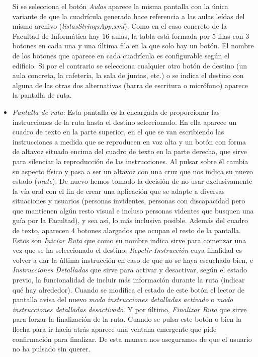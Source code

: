 \begin{itemize}
	Si se selecciona el botón \textit{Aulas} aparece la misma pantalla con la única variante de que la cuadrícula generada hace referencia a las aulas leídas del mismo archivo (\textit{listasStringsApp.xml}). Como en el caso concreto de la Facultad de Informática hay 16 aulas, la tabla está formada por 5 filas con 3 botones en cada una y una última fila en la que solo hay un botón. El nombre de los botones que aparece en cada cuadrícula es configurable según el edificio. Si por el contrario se selecciona cualquier otro botón de destino (un aula concreta, la cafetería, la sala de juntas, etc.) o se indica el destino con alguna de las otras dos alternativas (barra de escritura o micrófono) aparece la pantalla de ruta.
	
	\item \textit{Pantalla de ruta:} Esta pantalla es la encargada de proporcionar las instrucciones de la ruta hasta el destino seleccionado. En ella aparece un cuadro de texto en la parte superior, en el que se van escribiendo las instrucciones a medida que se reproducen en voz alta y un botón con forma de altavoz situado encima del cuadro de texto en la parte derecha, que sirve para silenciar la reproducción de las instrucciones. Al pulsar sobre él cambia su aspecto físico y pasa a ser un altavoz con una cruz que nos indica su nuevo estado (\textit{mute}). De nuevo hemos tomado la decisión de no usar exclusivamente la vía oral con el fin de crear una aplicación que se adapte a diversas situaciones y usuarios (personas invidentes, personas con discapacidad pero que mantienen algún resto visual e incluso personas videntes que busquen una guía por la Facultad), y sea así, lo más inclusiva posible. Además del cuadro de texto, aparecen 4 botones alargados que ocupan el resto de la pantalla. Estos son \textit{Iniciar Ruta} que como su nombre indica sirve para comenzar una vez que se ha seleccionado el destino, \textit{Repetir Instrucción} cuya finalidad es volver a dar la última instrucción en caso de que no se haya escuchado bien, e \textit{Instrucciones Detalladas} que sirve para activar y desactivar, según el estado previo, la funcionalidad de incluir más información durante la ruta (indicar qué hay alrededor). Cuando se modifica el estado de este botón el lector de pantalla avisa del nuevo \textit{modo instrucciones detalladas activado} o \textit{modo instrucciones detalladas desactivado}. Y por último, \textit{Finalizar Ruta} que sirve para forzar la finalización de la ruta. Cuando se pulsa este botón o bien la flecha para ir hacia atrás aparece una ventana emergente que pide confirmación para finalizar. De esta manera nos aseguramos de que el usuario no ha pulsado sin querer. 
	

\end{itemize}

